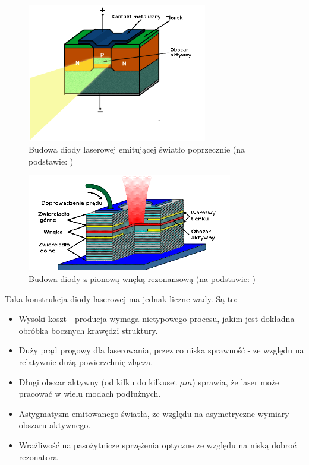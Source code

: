 \documentclass[a4paper,10pt]{article}
\begin{document}
\begin{figure}
\begin{center}
 \includegraphics[width=0.7\textwidth]{./obrazki/rys-eel.png}
\end{center}
\caption{Budowa diody laserowej emitującej światło poprzecznie (na podstawie: \cite{rys-laserki})}
\label{rys-eel}
\end{figure}


\begin{figure}
\begin{center}
 \includegraphics[width=0.8\textwidth]{./obrazki/rys-vcsel.png}
\end{center}
\caption{Budowa diody z pionową wnęką rezonansową (na podstawie: \cite{rys-laserki})}
\label{rys-vcsel}
\end{figure}

Taka konstrukcja diody laserowej ma jednak liczne wady. Są to:
\begin{itemize}
 \item Wysoki koszt - producja wymaga nietypowego procesu, jakim jest dokładna obróbka bocznych krawędzi struktury.
 \item Duży prąd progowy dla laserowania, przez co niska sprawność - ze względu na relatywnie dużą powierzchnię złącza.
 \item Długi obszar aktywny (od kilku do kilkuset $\mu m$) sprawia, że laser może pracować w wielu modach podłużnych.
 \item Astygmatyzm emitowanego światła, ze względu na asymetryczne wymiary obszaru aktywnego.
 \item Wrażliwość na pasożytnicze sprzężenia optyczne ze względu na niską dobroć rezonatora
\end{itemize}
\end{document}
